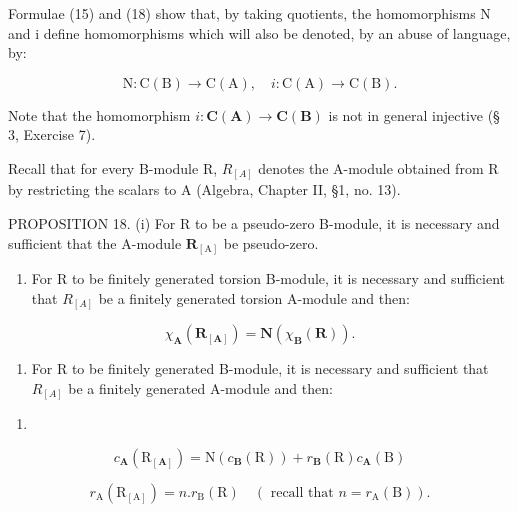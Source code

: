 Formulae (15) and (18) show that, by taking quotients, the homomorphisms N and i define homomorphisms which will also be denoted, by an abuse of language, by:

\[
\mathrm{N}: \mathrm{C} (\mathrm{B}) \rightarrow \mathrm{C} (\mathrm{A}), \quad i: \mathrm{C} (\mathrm{A}) \rightarrow \mathrm{C} (\mathrm{B}).
\]

Note that the homomorphism \(i\colon\mathbf{C}(\mathbf{A})\to\mathbf{C}(\mathbf{B})\) is not in general injective (§ 3, Exercise 7).

Recall that for every B-module R, \(R_{[A]}\) denotes the A-module obtained from R by restricting the scalars to A (Algebra, Chapter II, §1, no. 13).

PROPOSITION 18. (i) For R to be a pseudo-zero B-module, it is necessary and sufficient that the A-module \(\mathbf{R}_{[\mathrm{A}]}\) be pseudo-zero.

\begin{enumerate}
\def\labelenumi{(\roman{enumi})}
\setcounter{enumi}{1}
\tightlist
\item
  For R to be finitely generated torsion B-module, it is necessary and sufficient that \(R_{[A]}\) be a finitely generated torsion A-module and then:
\end{enumerate}

\[
\chi_ {\mathbf {A}} (\mathbf {R} _ {[ \mathbf {A} ]}) = \mathbf {N} (\chi_ {\mathbf {B}} (\mathbf {R})).\tag{19}
\]

\begin{enumerate}
\def\labelenumi{(\roman{enumi})}
\setcounter{enumi}{2}
\tightlist
\item
  For R to be finitely generated B-module, it is necessary and sufficient that \(R_{[A]}\) be a finitely generated A-module and then:
\end{enumerate}

\begin{enumerate}
\def\labelenumi{(\arabic{enumi})}
\setcounter{enumi}{19}
\tightlist
\item
\end{enumerate}

\[
c _ {\mathbf {A}} (\mathrm{R} _ {[ \mathbf {A} ]}) = \mathrm{N} (c _ {\mathbf {B}} (\mathrm{R})) + r _ {\mathbf {B}} (\mathrm{R}) c _ {\mathbf {A}} (\mathrm{B})\tag{21}
\]

\[
r _ {\mathrm{A}} (\mathrm{R} _ {[ \mathrm{A} ]}) = n. r _ {\mathrm{B}} (\mathrm{R}) \quad (\text { recall   that } n = r _ {\mathrm{A}} (\mathrm{B})).
\]

